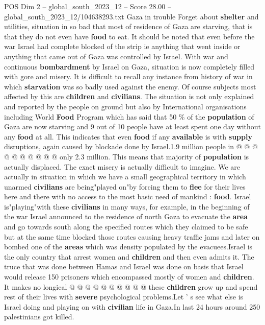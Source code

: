 \begin{textsample}{POS Dim 2 – global\_south\_2023\_12 – Score 28.00 – global\_south\_2023\_12/104638293.txt}  \label{ex:f2_pos_029}
Gaza in trouble Forget about \textbf{shelter} and utilities, situation in so bad that most of residence of Gaza are starving, that is that they do not even have \textbf{food} to eat.
It should be noted that even before the war Israel had complete blocked of the strip ie anything that went inside or anything that came out of Gaza was controlled by Israel.
With war and continuous \textbf{bombardment} by Israel on Gaza, situation is now completely filled with gore and misery.
It is difficult to recall any instance from history of war in which \textbf{starvation} was so badly used against the enemy.
Of course subjects most affected by this are \textbf{children} and \textbf{civilians}.
The situation is not only explained and reported by the people on ground but also by International organisations including World \textbf{Food} Program which has said that 50 \% of the \textbf{population} of Gaza are now starving and 9 out of 10 people have at least spent one day without any \textbf{food} at all.
This indicates that even \textbf{food} if any \textbf{available} is with \textbf{supply} disruptions, again caused by blockade done by Israel.1.9 million people in @ @ @ @ @ @ @ @ @ @ only 2.3 million.
This means that majority of \textbf{population} is actually displaced.
The exact misery is actually difficult to imagine.
We are actually in situation in which we have a small geographical territory in which unarmed \textbf{civilians} are being"played on"by forcing them to \textbf{flee} for their lives here and there with no access to the most basic need of mankind : \textbf{food}.
Israel is"playing"with these \textbf{civilians} in many ways, for example, in the beginning of the war Israel announced to the residence of north Gaza to evacuate the \textbf{area} and go towards south along the specified routes which they claimed to be safe but at the same time blocked those routes causing heavy traffic jams and later on bombed one of the \textbf{areas} which was density populated by the evacuees.Israel is the only country that arrest women and \textbf{children} and then even admits it.
The truce that was done between Hamas and Israel was done on basis that Israel would release 150 prisoners which encompassed mostly of women and \textbf{children}.
It makes no longical @ @ @ @ @ @ @ @ @ @ these \textbf{children} grow up and spend rest of their lives with \textbf{severe} psychological problems.Let ' s see what else is Israel doing and playing on with \textbf{civilian} life in Gaza.In last 24 hours around 250 palestinians got killed.

\end{textsample}
